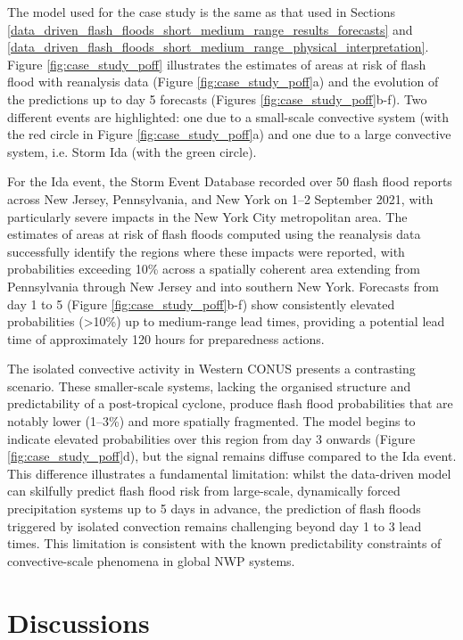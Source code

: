 The model used for the case study is the same as that used in Sections \ref{data_driven_flash_floods_short_medium_range_results_forecasts} and \ref{data_driven_flash_floods_short_medium_range_physical_interpretation}. 
Figure \ref{fig:case_study_poff} illustrates the estimates of areas at risk of flash flood with reanalysis data (Figure \ref{fig:case_study_poff}a) and the evolution of the predictions up to day 5 forecasts (Figures \ref{fig:case_study_poff}b-f). Two different events are highlighted: one due to a small-scale convective system (with the red circle in Figure \ref{fig:case_study_poff}a) and one due to a large convective system, i.e. Storm Ida (with the green circle). 

For the Ida event, the Storm Event Database recorded over 50 flash flood reports across New Jersey, Pennsylvania, and New York on 1–2 September 2021, with particularly severe impacts in the New York City metropolitan area. The estimates of areas at risk of flash floods computed using the reanalysis data successfully identify the regions where these impacts were reported, with probabilities exceeding 10\% across a spatially coherent area extending from Pennsylvania through New Jersey and into southern New York. Forecasts from day 1 to 5 (Figure \ref{fig:case_study_poff}b-f) show consistently elevated probabilities (>10\%) up to medium-range lead times, providing a potential lead time of approximately 120 hours for preparedness actions.

The isolated convective activity in Western CONUS presents a contrasting scenario. These smaller-scale systems, lacking the organised structure and predictability of a post-tropical cyclone, produce flash flood probabilities that are notably lower (1–3\%) and more spatially fragmented. The model begins to indicate elevated probabilities over this region from day 3 onwards (Figure \ref{fig:case_study_poff}d), but the signal remains diffuse compared to the Ida event. This difference illustrates a fundamental limitation: whilst the data-driven model can skilfully predict flash flood risk from large-scale, dynamically forced precipitation systems up to 5 days in advance, the prediction of flash floods triggered by isolated convection remains challenging beyond day 1 to 3 lead times. This limitation is consistent with the known predictability constraints of convective-scale phenomena in global NWP systems.

\section{Discussions}
\label{data_driven_flash_floods_short_medium_range_discussions}

